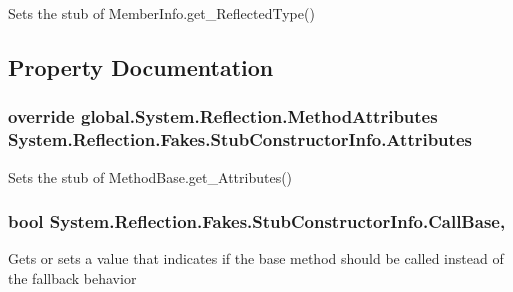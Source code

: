 Sets the stub of Member\-Info.\-get\-\_\-\-Reflected\-Type()



\subsection{Property Documentation}
\hypertarget{class_system_1_1_reflection_1_1_fakes_1_1_stub_constructor_info_a83c0d498a902a2dd39dcf8314bc801cc}{
\subsubsection[{Attributes}]{\setlength{\rightskip}{0pt plus 5cm}override global.\-System.\-Reflection.\-Method\-Attributes System.\-Reflection.\-Fakes.\-Stub\-Constructor\-Info.\-Attributes\hspace{0.3cm}{\ttfamily [get]}}}\label{class_system_1_1_reflection_1_1_fakes_1_1_stub_constructor_info_a83c0d498a902a2dd39dcf8314bc801cc}


Sets the stub of Method\-Base.\-get\-\_\-\-Attributes()

\hypertarget{class_system_1_1_reflection_1_1_fakes_1_1_stub_constructor_info_aef347b97f710fc343f6837edcd3899e5}{
\subsubsection[{Call\-Base}]{\setlength{\rightskip}{0pt plus 5cm}bool System.\-Reflection.\-Fakes.\-Stub\-Constructor\-Info.\-Call\-Base\hspace{0.3cm}{\ttfamily [get]}, {\ttfamily [set]}}}\label{class_system_1_1_reflection_1_1_fakes_1_1_stub_constructor_info_aef347b97f710fc343f6837edcd3899e5}


Gets or sets a value that indicates if the base method should be called instead of the fallback behavior

